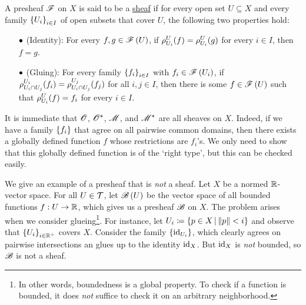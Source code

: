 \documentclass[../Moduli_Spaces_of_Riemann_Surfaces.tex]{subfiles}
\begin{document}
    \begin{definition}
        A presheaf $\mathscr{F}$ on $X$ is said to be a \ul{sheaf} if for every open set $U\subseteq X$ and every family $\left\{U_i\right\}_{i\in I}$ of open subsets that cover $U$, the following two properties hold:
        \begin{itemize}
            \item[$\bullet$] (Identity): For every $f,g\in\mathscr{F}\left(U\right)$, if $\rho^U_{U_i}\!\left(f\right)=\rho^U_{U_i}\!\left(g\right)$ for every $i\in I$, then $f=g$.
                \vspace{-0.1in}
            \item[$\bullet$] (Gluing): For every family $\left\{f_i\right\}_{i\in I}$ with $f_i\in\mathscr{F}\left(U_i\right)$, if $\rho^{U_i}_{U_i\cap U_j}\!\left(f_i\right)=\rho^{U_j}_{U_i\cap U_j}\!\left(f_j\right)$ for all $i,j\in I$, then there is some $f\in\mathscr{F}\left(U\right)$ such that $\rho^U_{U_i}\!\left(f\right)=f_i$ for every $i\in I$.
        \end{itemize}
    \end{definition}
    \begin{example}
        It is immediate that $\mathscr{O}$, $\mathscr{O}^\ast$, $\mathscr{M}$, and $\mathscr{M}^\ast$ are all sheaves on $X$. Indeed, if we have a family $\left\{f_i\right\}$ that agree on all pairwise common domains, then there exists a globally defined function $f$ whose restrictions are $f_i$'s. We only need to show that this globally defined function is of the `right type', but this can be checked easily.\exqed
    \end{example}
    \begin{example}
        We give an example of a presheaf that is \textit{not} a sheaf. Let $X$ be a normed $\mathbb{R}$-vector space. For all $U\in\mathcal{T}$, let $\mathscr{B}\left(U\right)$ be the vector space of all bounded functions $f:U\to\mathbb{R}$, which gives us a presheaf $\mathscr{B}$ on $X$. The problem arises when we consider glueing\footnote{In other words, boundedness is a global property. To check if a function is bounded, it does \textit{not} suffice to check it on an arbitrary neighborhood.}. For instance, let $U_i\coloneqq\left\{p\in X\,\middle\vert\,\left\|p\right\|<i\right\}$ and observe that $\left\{U_i\right\}_{i\in\mathbb{R}^+}$ covers $X$. Consider the family $\left\{\operatorname{id}_{U_i}\right\}$, which clearly agrees on pairwise intersections an glues up to the identity $\operatorname{id}_X$. But $\operatorname{id}_X$ is \textit{not} bounded, so $\mathscr{B}$ is not a sheaf.\exqed
    \end{example}
\end{document}
